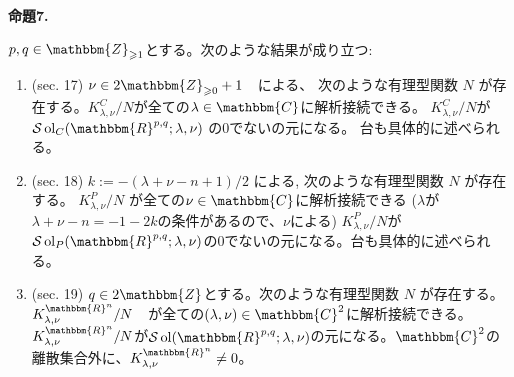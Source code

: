 \documentclass[a4paper]{article} %
\newcommand{\assign}{:=}
\newcommand{\tmop}[1]{\ensuremath{\operatorname{#1}}}
\newcommand{\tmtextbf}[1]{{\bfseries{#1}}}
\newcommand{\tmtextit}[1]{{\itshape{#1}}}
\begin{document}
{\noindent}\tmtextbf{命題\textbf{7}.}\tmtextit{$p, q \in
 \mathbbm{Z}_{\geqslant 1}$とする。次のような結果が成り立つ:
\begin{enumerate}
 \item (sec. 17) $\nu \in 2\mathbbm{Z}_{\geqslant 0}+1$　による、 次のような有理型関数 $N$ が存在する。$K_{\lambda, \nu}^C / N$が全ての$\lambda \in \mathbbm{C}$に解析接続できる。
 $K_{\lambda, \nu}^C / N$が$\mathcal{S} \tmop{ol}_C ( \mathbbm{R}^{p, q} ; \lambda, \nu)$ の0でないの元になる。
 台も具体的に述べられる。
 
 \item (sec. 18) $k \assign - ( \lambda + \nu - n + 1) / 2$
による, 次のような有理型関数 $N$ が存在する。
$K_{\lambda, \nu}^P / N$
が全ての$\nu\in \mathbbm{C}$に解析接続できる ($\lambda$が$\lambda + \nu - n = - 1 - 2 k$の条件があるので、$\nu$による)
$K_{\lambda, \nu}^P / N$が$\mathcal{S}\tmop{ol}_P ( \mathbbm{R}^{p, q} ;
 \lambda, \nu)$の0でないの元になる。台も具体的に述べられる。
 
 \item (sec. 19) $q \in 2\mathbbm{Z}$とする。次のような有理型関数 $N$ が存在する。$K_{\lambda, \nu}^{\mathbbm{R}^n} / N$　が全ての$(\lambda,\nu) \in \mathbbm{C}^2$に解析接続できる。
$K_{\lambda, \nu}^{\mathbbm{R}^n} / N$が$\mathcal{S}\tmop{ol} ( \mathbbm{R}^{p, q} ;
 \lambda, \nu)$の元になる。$\mathbbm{C}^2$の離散集合外に、$K_{\lambda, \nu}^{\mathbbm{R}^n}\neq0$。
\end{enumerate}}{\hspace*{\fill}}{\medskip}
\end{document}
